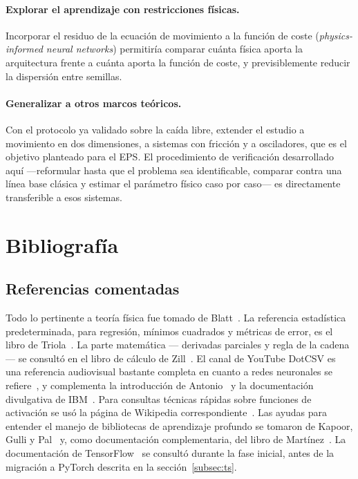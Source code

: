 \documentclass[titlepage,11pt]{article}
\begin{document}
\paragraph{Explorar el aprendizaje con restricciones físicas.} Incorporar el
residuo de la ecuación de movimiento a la función de coste (\emph{physics-informed
neural networks}) permitiría comparar cuánta física aporta la arquitectura
frente a cuánta aporta la función de coste, y previsiblemente reducir la
dispersión entre semillas.

\paragraph{Generalizar a otros marcos teóricos.} Con el protocolo ya validado
sobre la caída libre, extender el estudio a movimiento en dos dimensiones, a
sistemas con fricción y a osciladores, que es el objetivo planteado para el
EPS. El procedimiento de verificación desarrollado aquí ---reformular hasta que
el problema sea identificable, comparar contra una línea base clásica y estimar
el parámetro físico caso por caso--- es directamente transferible a esos
sistemas.


\section{Bibliografía}
\label{sec:biografia}

\subsection*{Referencias comentadas}
\label{sec:referencias}

Todo lo pertinente a teoría física fue tomado de Blatt~\cite{Fisica}. La
referencia estadística predeterminada, para regresión, mínimos cuadrados y
métricas de error, es el libro de Triola~\cite{triola_2018_estadstica}. La parte
matemática --- derivadas parciales y regla de la cadena --- se consultó en el
libro de cálculo de Zill~\cite{zill_1985_clculo}. El canal de YouTube DotCSV es
una referencia audiovisual bastante completa en cuanto a redes neuronales se
refiere~\cite{santana_2018_1,santana_2018_2,santana_2018_3,santana_2018_3_5}, y
complementa la introducción de Antonio~\cite{antonio_2023_introduccin} y la
documentación divulgativa de IBM~\cite{ibm_qu}. Para consultas técnicas rápidas
sobre funciones de activación se usó la página de Wikipedia
correspondiente~\cite{wikipediacontributors_2018_activation}. Las ayudas para
entender el manejo de bibliotecas de aprendizaje profundo se tomaron de Kapoor,
Gulli y Pal~\cite{Amita} y, como documentación complementaria, del libro de
Martínez~\cite{Jesus}. La documentación de TensorFlow~\cite{TensorFlow} se
consultó durante la fase inicial, antes de la migración a PyTorch descrita en
la sección~\ref{subsec:ts}.



\end{document}
